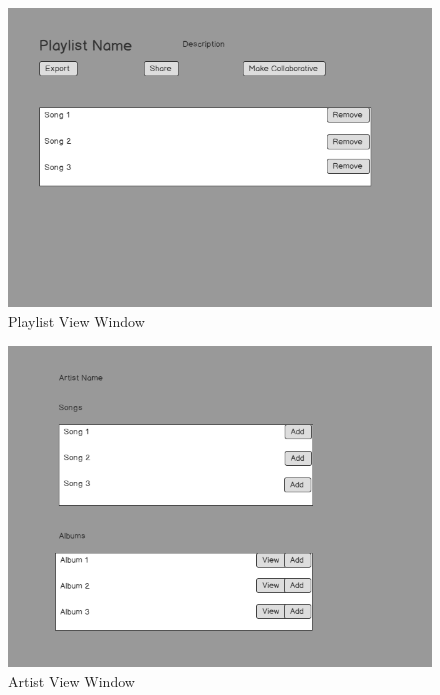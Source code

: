 \documentclass[12pt]{article}
\begin{document}
	\begin{figure}[H]
	\centering
	\includegraphics[scale=0.35]{PlaylistWindow.png}
	\caption{Playlist View Window}
	\label{fig:playlist}
	\end{figure}
	\begin{figure}[H]
		\centering
		\includegraphics[scale=0.35]{ArtistWindow.png}
		\caption{Artist View Window}
		\label{fig:artist}
	\end{figure}
\end{document}
